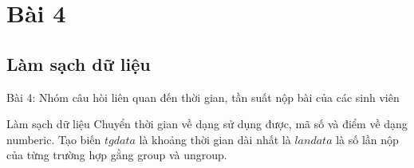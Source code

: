 \documentclass[english,10pt,table]{beamer}
\begin{document}
\section {Bài 4}
\subsection{Làm sạch dữ liệu}
\begin{frame}{Bài 4: Nhóm câu hòi liên quan đến thời gian, tần suất nộp bài của các sinh viên}
    \begin{block}{Làm sạch dữ liệu}
    \noindent Chuyển thời gian về dạng sử dụng được, mã số và điểm về dạng numberic. Tạo biến $tgdata$ là khoảng thời gian dài nhất là $landata$ là số lần nộp của từng trường hợp gằng group và ungroup. 
    \end{block}
\end{frame}
\end{document}
